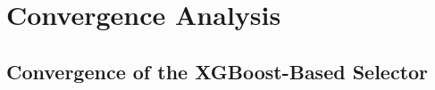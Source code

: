 \documentclass[journal]{IEEEtran}
\begin{document}

    
    

    \appendices

    \section{Convergence Analysis}
    \label{appendix:convergence}


    \subsection{Convergence of the XGBoost-Based Selector}
    \label{sec:xgb_convergence}
\end{document}

